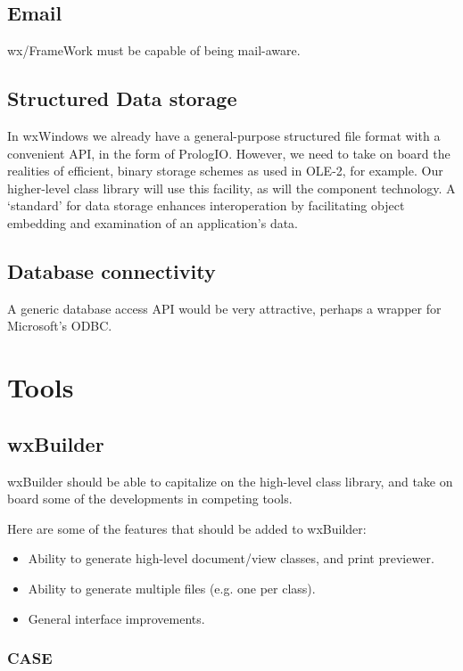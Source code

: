 \section{Email}

wx/FrameWork must be capable of being mail-aware.

\section{Structured Data storage}

In wxWindows we already have a general-purpose structured file format
with a convenient API, in the form of PrologIO. However, we need to take
on board the realities of efficient, binary storage schemes as used in
OLE-2, for example. Our higher-level class library will use this
facility, as will the component technology. A `standard' for data
storage enhances interoperation by facilitating object embedding and
examination of an application's data.

\section{Database connectivity}

A generic database access API would be very attractive, perhaps a wrapper
for Microsoft's ODBC.

\chapter{Tools}

\section{wxBuilder}

wxBuilder should be able to capitalize on the high-level class library,
and take on board some of the developments in competing tools.

Here are some of the features that should be added to wxBuilder:

\begin{itemize}
\item Ability to generate high-level document/view classes, and print
previewer.
\item Ability to generate multiple files (e.g. one per class).
\item General interface improvements.
\end{itemize}

\subsection{CASE}

